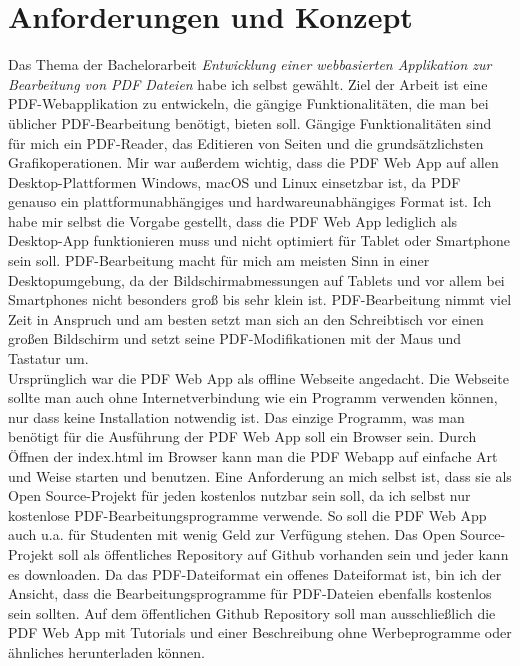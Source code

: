 \chapter{Anforderungen und Konzept}
Das Thema der Bachelorarbeit \textit{\glqq Entwicklung einer webbasierten Applikation zur Bearbeitung von PDF Dateien\grqq} habe ich selbst gewählt. Ziel der Arbeit ist eine PDF-Webapplikation zu entwickeln, die gängige Funktionalitäten, die man bei üblicher PDF-Bearbeitung benötigt, bieten soll. Gängige Funktionalitäten sind für mich ein PDF-Reader, das Editieren von Seiten und die grundsätzlichsten Grafikoperationen. Mir war außerdem wichtig, dass die PDF Web App auf allen Desktop-Plattformen Windows, macOS und Linux einsetzbar ist, da PDF genauso ein plattformunabhängiges und hardwareunabhängiges Format ist. Ich habe mir selbst die Vorgabe gestellt, dass die PDF Web App lediglich als Desktop-App funktionieren muss und nicht optimiert für Tablet oder Smartphone sein soll. PDF-Bearbeitung macht für mich am meisten Sinn in einer Desktopumgebung, da der Bildschirmabmessungen auf Tablets und vor allem bei Smartphones nicht besonders groß bis sehr klein ist. PDF-Bearbeitung nimmt viel Zeit in Anspruch und am besten setzt man sich an den Schreibtisch vor einen großen Bildschirm und setzt seine PDF-Modifikationen mit der Maus und Tastatur um. \\
Ursprünglich war die PDF Web App als offline Webseite angedacht. Die Webseite sollte man auch ohne Internetverbindung wie ein Programm verwenden können, nur dass keine Installation notwendig ist. Das einzige Programm, was man benötigt für die Ausführung der PDF Web App soll ein Browser sein. Durch Öffnen der index.html im Browser kann man die PDF Webapp auf einfache Art und Weise starten und benutzen. Eine Anforderung an mich selbst ist, dass sie als Open Source-Projekt für jeden kostenlos nutzbar sein soll, da ich selbst nur kostenlose PDF-Bearbeitungsprogramme verwende. So soll die PDF Web App auch u.a. für Studenten mit wenig Geld zur Verfügung stehen. Das Open Source-Projekt soll als öffentliches Repository auf Github vorhanden sein und jeder kann es downloaden. Da das PDF-Dateiformat ein offenes Dateiformat ist, bin ich der Ansicht, dass die Bearbeitungsprogramme für PDF-Dateien ebenfalls kostenlos sein sollten. Auf dem öffentlichen Github Repository soll man ausschließlich die PDF Web App mit Tutorials und einer Beschreibung ohne Werbeprogramme oder ähnliches herunterladen können. \\
